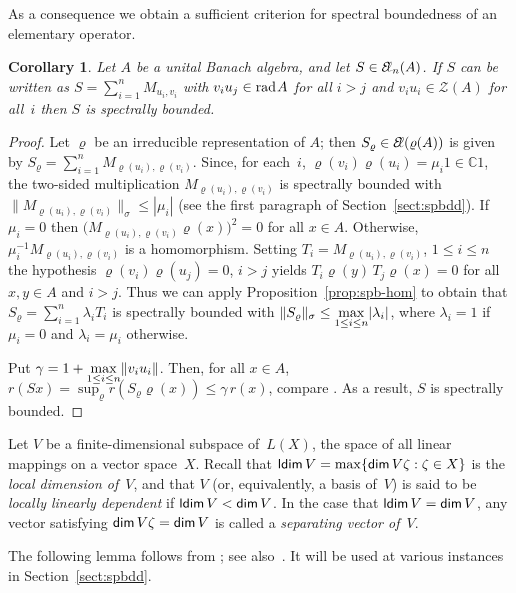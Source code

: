 \documentclass[a4paper,12pt,reqno]{amsart}
\numberwithin{equation}{section}
\newtheorem{cor}[thm]{Corollary}
\theoremstyle{definition}
\begin{document}
As a consequence we obtain a sufficient criterion for spectral boundedness of an elementary operator.
\begin{cor}\label{cor:sufficient-cond}
Let\/ $A$ be a  unital Banach algebra, and let\/ $S\in{{\mathcal{E}\kern-2.6pt\ell_n(A)}}$. If\/ $S$ can be written as\/ $S=\sum_{i=1}^nM_{u_i,v_i}$
with\/ $v_iu_j\in{{\textup{rad}\kern.7pt A}}$ for all $i>j$ and\/ $v_iu_i\in{\mathcal Z(A)}$ for all~$i$ then\/ $S$ is spectrally bounded.
\end{cor}
\begin{proof}
Let $\varrho$ be an irreducible representation of $A$; then $S_\varrho\in{{\mathcal{E}\kern-2.6pt\ell({{\varrho(A)}})}}$ is given by
$S_\varrho=\sum_{i=1}^nM_{\varrho(u_i),\varrho(v_i)}$. Since, for each~$i$, $\varrho(v_i)\varrho(u_i)=\mu_i1\in{\mathbb{C}}1$,
the two-sided multiplication $M_{\varrho(u_i),\varrho(v_i)}$ is spectrally bounded with
$\|M_{\varrho(u_i),\varrho(v_i)}\|_\sigma\leq|\mu_i|$ (see the first paragraph of Section~\ref{sect:spbdd}).
If $\mu_i=0$ then $\bigl(M_{\varrho(u_i),\varrho(v_i)}\varrho(x)\bigr)^2=0$
for all $x\in A$. Otherwise, $\mu_i^{-1}M_{\varrho(u_i),\varrho(v_i)}$ is a homomorphism.
Setting $T_i=M_{\varrho(u_i),\varrho(v_i)}$, $1\leq i\leq n$ the hypothesis $\varrho(v_i)\varrho(u_j)=0$, $i>j$
yields $T_i\varrho(y)\,T_j\varrho(x)=0$ for all $x,y\in A$ and $i>j$. Thus we can apply Proposition~\ref{prop:spb-hom} to obtain
that $S_\varrho=\sum_{i=1}^n\lambda_iT_i$ is spectrally bounded with
$\|S_\varrho\|_\sigma\leq\smash{\max\limits_{1\leq i\leq n}}|\lambda_i|\vphantom{I_{I_I}}$,
where $\lambda_i=1$ if $\mu_i=0$ and $\lambda_i=\mu_i$ otherwise.

Put $\gamma=1+\smash{\max\limits_{1\leq i\leq n}}\|v_iu_i\|$. Then, for all $x\in A$,
$r(Sx)=\sup_\varrho r(S_\varrho\varrho(x))\leq\gamma\, r(x)$, compare \cite[p.~4]{NaMa11}.
As a result, $S$ is spectrally bounded.
\end{proof}

Let $V$  be a finite-dimensional subspace of~$L(X)$, the space of all linear mappings on a vector space~$X$.
Recall that ${{\sf ldim}\,} V= \max \{ {{\sf dim}\,} V \zeta: \zeta \in X \}$ is the \textit{local dimension of}~$V$, and
that $V$ (or, equivalently, a basis of~$V$) is said to be \textit{locally linearly dependent\/}  if ${{\sf ldim}\,} V < {{\sf dim}\,} V$.
In the case that ${{\sf ldim}\,} V= {{\sf dim}\,} V$, any vector satisfying ${{\sf dim}\,} V \zeta={{\sf dim}\,} V$ is called a \textit{separating vector of}~$V$.

The following lemma follows from \cite[Lemma 2.1]{BrSe}; see also~\cite{GoLaWo}. It will be used at
various instances in Section~\ref{sect:spbdd}.
\end{document}
